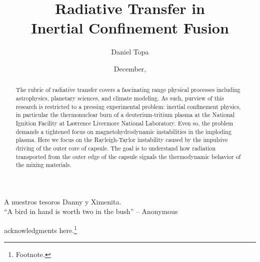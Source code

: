 \documentclass[botnum, fleqn]{unmeethesis}
\begin{document}
\lstset{language=Fortran}
\frontmatter



\title{Radiative Transfer in \\[20pt]Inertial Confinement Fusion}

\author{Daniel Topa}





\date{December, \thisyear}

\maketitle

\makecopyright

\begin{dedication}
   A nuestros tesoros Danny y Ximenita. \\[3ex]
   ``A bird in hand is worth two in the bush''
         -- Anonymous
\end{dedication}

\begin{acknowledgments}
   \vspace{1.1in}
   acknowledgments here.\footnote{Footnote.}
\end{acknowledgments}

\maketitleabstract %

\begin{abstract}
   The rubric of radiative transfer covers a fascinating range physical processes including astrophysics, planetary sciences, and climate modeling. As such, purview of this research is restricted to a pressing experimental problem: inertial confinement physics, in particular the thermonuclear burn of a deuterium-tritium plasma at the National Ignition Facility at Lawrence Livermore National Laboratory. Even so, the problem demands a tightened focus on magnetohydrodynamic instabilities in the imploding plasma. Here we focus on the Rayleigh-Taylor instability caused by the impulsive driving of the outer core of capsule. The goal is to understand how radiation transported from the outer edge of the capsule signals the thermodynamic behavior of the mixing materials.
   
\clearpage %
\end{abstract}
\end{document}
